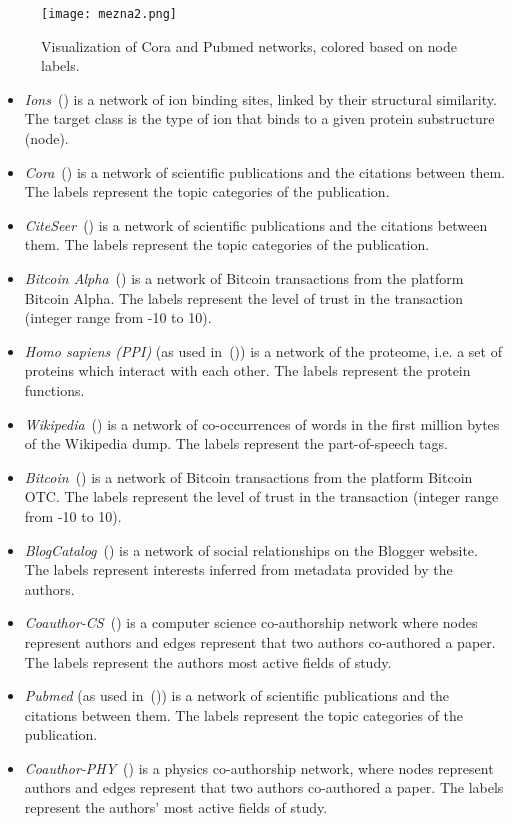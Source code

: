 \documentclass[twoside,11pt]{article}
\begin{document}
\begin{figure}[t!]
  \centering
  \texttt{[image: mezna2.png]}
  \caption{Visualization of Cora and Pubmed networks, colored based on node labels.}
  \label{fig:networks}
\end{figure}

\begin{itemize}
\item \emph{Ions}~(\cite{skrlj2019deep,minfskrlj}) is a network of ion binding sites, linked by their structural similarity. The target class is the type of ion that binds to a given protein substructure (node).
\item \emph{Cora}~(\cite{Qing2003citeseer}) is a network of scientific publications and the citations between them. The labels represent the topic categories of the publication.
\item \emph{CiteSeer}~(\cite{Qing2003citeseer}) is a network of scientific publications and the citations between them. The labels represent the topic categories of the publication.
\item \emph{Bitcoin Alpha}~(\cite{skrlj2019deep}) is a network of Bitcoin transactions from the platform Bitcoin Alpha. The labels represent the level of trust in the transaction (integer range from -10 to 10).
\item \emph{Homo sapiens (PPI)} (as used in~(\cite{grover2016node2vec})) is a network of the proteome, i.e. a set of proteins which interact with each other. The labels represent the protein functions.
\item \emph{Wikipedia}~(\cite{mahoney2011large}) is a network of co-occurrences of words in the first million bytes of the Wikipedia dump. The labels represent the part-of-speech tags.
\item \emph{Bitcoin}~(\cite{skrlj2019deep}) is a network of Bitcoin transactions from the platform Bitcoin OTC. The labels represent the level of trust in the transaction (integer range from -10 to 10).
\item \emph{BlogCatalog}~(\cite{zafarani2009social}) is a network of social relationships on the Blogger website. The labels represent interests inferred from metadata provided by the authors. 
\item \emph{Coauthor-CS}~(\cite{oleks2018pitfalls}) is a computer science co-authorship network where nodes represent authors and edges represent that two authors co-authored a paper. The labels represent the authors most active fields of study.
\item \emph{Pubmed} (as used in~(\cite{wang2020unifying})) is a network of scientific publications and the citations between them. The labels represent the topic categories of the publication.
\item \emph{Coauthor-PHY}~(\cite{oleks2018pitfalls}) is a physics co-authorship network, where nodes represent authors and edges represent that two authors co-authored a paper. The labels represent the authors' most active fields of study.
\end{itemize}
\end{document}
